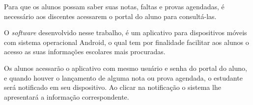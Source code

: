 
	\par Para que os alunos possam saber suas notas, faltas e provas agendadas,
é necessário aos discentes acessarem o portal do aluno para consultá-las.

	\par O \textit{software} desenvolvido nesse trabalho, é um aplicativo para
dispositivos móveis com sistema operacional Android, o qual tem por
finalidade facilitar aos alunos o acesso as suas informações escolares mais
procuradas.
	
	\par Os alunos acessarão o aplicativo com mesmo usuário e senha do
portal do aluno, e quando houver o lançamento de alguma nota ou prova agendada,
o estudante será notificado em seu dispositivo. Ao clicar na notificação
o sistema lhe apresentará a informação correspondente. 